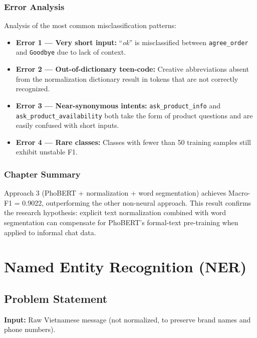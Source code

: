 \documentclass[12pt, a4paper]{report}
\begin{document}
\subsection{Error Analysis}

Analysis of the most common misclassification patterns:

\begin{itemize}
  \item \textbf{Error 1 --- Very short input:}
        ``\textit{ok}'' is misclassified between \texttt{agree\_order}
        and \texttt{Goodbye} due to lack of context.
  \item \textbf{Error 2 --- Out-of-dictionary teen-code:}
        Creative abbreviations absent from the normalization dictionary
        result in tokens that are not correctly recognized.
  \item \textbf{Error 3 --- Near-synonymous intents:}
        \texttt{ask\_product\_info} and \texttt{ask\_product\_availability}
        both take the form of product questions and are easily confused with short inputs.
  \item \textbf{Error 4 --- Rare classes:}
        Classes with fewer than 50 training samples still exhibit unstable F1.
\end{itemize}

\subsection{Chapter Summary}

Approach 3 (PhoBERT + normalization + word segmentation) achieves Macro-F1 = 0.9022,
outperforming the other non-neural approach.
This result confirms the research hypothesis: explicit text normalization
combined with word segmentation can compensate for PhoBERT's formal-text pre-training
when applied to informal chat data.

\chapter{Named Entity Recognition (NER)}

\section{Problem Statement}

\textbf{Input:} Raw Vietnamese message (not normalized, to preserve
brand names and phone numbers).
\end{document}
